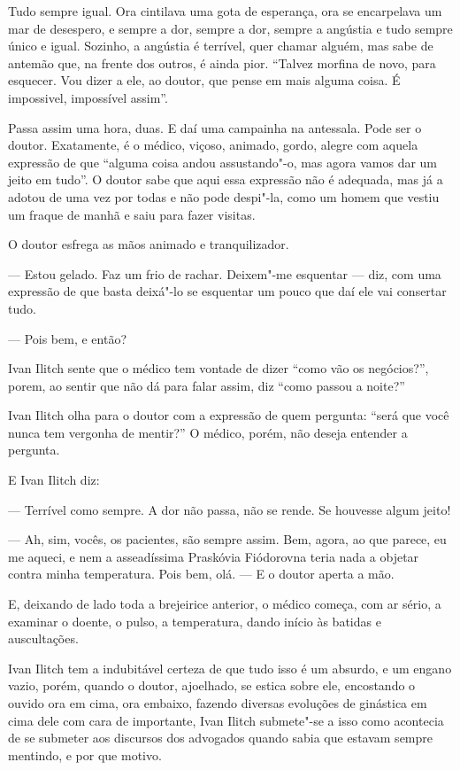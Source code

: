 Tudo sempre igual. Ora cintilava uma gota de esperança, ora se
encarpelava um mar de desespero, e sempre a dor, sempre a dor, sempre a
angústia e tudo sempre único e igual. Sozinho, a angústia é terrível,
quer chamar alguém, mas sabe de antemão que, na frente dos outros, é
ainda pior. ``Talvez morfina de novo, para esquecer. Vou dizer a ele, ao
doutor, que pense em mais alguma coisa. É impossivel, impossível
assim''.

Passa assim uma hora, duas. E daí uma campainha na antessala. Pode ser o
doutor. Exatamente, é o médico, viçoso, animado, gordo, alegre com
aquela expressão de que ``alguma coisa andou assustando"-o, mas agora
vamos dar um jeito em tudo''. O doutor sabe que aqui essa expressão não
é adequada, mas já a adotou de uma vez por todas e não pode despi"-la,
como um homem que vestiu um fraque de manhã e saiu para fazer visitas.

O doutor esfrega as mãos animado e tranquilizador.

--- Estou gelado. Faz um frio de rachar. Deixem"-me esquentar --- diz, com
uma expressão de que basta deixá"-lo se esquentar um pouco que daí ele
vai consertar tudo.

--- Pois bem, e então?

Ivan Ilitch sente que o médico tem vontade de dizer ``como vão os
negócios?'', porem, ao sentir que não dá para falar assim, diz ``como
passou a noite?''

Ivan Ilitch olha para o doutor com a expressão de quem pergunta: ``será
que você nunca tem vergonha de mentir?'' O médico, porém, não deseja
entender a pergunta.

E Ivan Ilitch diz:

--- Terrível como sempre. A dor não passa, não se rende. Se houvesse algum
jeito!

--- Ah, sim, vocês, os pacientes, são sempre assim. Bem, agora, ao que
parece, eu me aqueci, e nem a asseadíssima Praskóvia Fiódorovna teria
nada a objetar contra minha temperatura. Pois bem, olá. --- E o doutor
aperta a mão.

E, deixando de lado toda a brejeirice anterior, o médico começa, com ar
sério, a examinar o doente, o pulso, a temperatura, dando início às
batidas e auscultações.

Ivan Ilitch tem a indubitável certeza de que tudo isso é um absurdo, e
um engano vazio, porém, quando o doutor, ajoelhado, se estica sobre ele,
encostando o ouvido ora em cima, ora embaixo, fazendo diversas evoluções
de ginástica em cima dele com cara de importante, Ivan Ilitch submete"-se
a isso como acontecia de se submeter aos discursos dos advogados quando
sabia que estavam sempre mentindo, e por que motivo.

